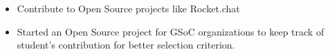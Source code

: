 
{\fontsize{11pt}{1em}\bodyfontlight\upshape\color{text}
  \begin{itemize}
  \item Contribute to Open Source projects like Rocket.chat
  \item Started an Open Source project for GSoC organizations to keep track of student's contribution for better selection criterion.
  \end{itemize}
}